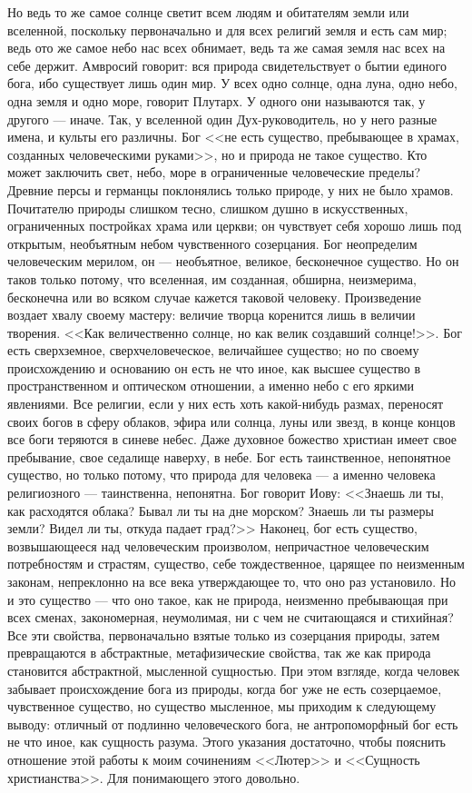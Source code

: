 \documentclass[12pt,oneside]{book}
\begin{document}
Но ведь то же самое солнце светит всем людям и обитателям земли или вселенной, поскольку первоначально и для всех религий земля и есть сам мир; ведь ото же самое небо нас всех обнимает, ведь та же самая земля нас всех на себе держит. Амвросий говорит: вся природа свидетельствует о бытии единого бога, ибо существует лишь один мир. У всех одно солнце, одна луна, одно небо, одна земля и одно море, говорит Плутарх. У одного они называются так, у другого --- иначе. Так, у вселенной один Дух-руководитель, но у него разные имена, и культы его различны. Бог <<не есть существо, пребывающее в храмах, созданных человеческими руками>>, но и природа не такое существо. Кто может заключить свет, небо, море в ограниченные человеческие пределы? Древние персы и германцы поклонялись только природе, у них не было храмов. Почитателю природы слишком тесно, слишком душно в искусственных, ограниченных постройках храма или церкви; он чувствует себя хорошо лишь под открытым, необъятным небом чувственного созерцания. Бог неопределим человеческим мерилом, он --- необъятное, великое, бесконечное существо. Но он таков только потому, что вселенная, им созданная, обширна, неизмерима, бесконечна или во всяком случае кажется таковой человеку. Произведение воздает хвалу своему мастеру: величие творца коренится лишь в величии творения. <<Как величественно солнце, но как велик создавший солнце!>>. Бог есть сверхземное, сверхчеловеческое, величайшее существо; но по своему происхождению и основанию он есть не что иное, как высшее существо в пространственном и оптическом отношении, а именно небо с его яркими явлениями. Все религии, если у них есть хоть какой-нибудь размах, переносят своих богов в сферу облаков, эфира или солнца, луны или звезд, в конце концов все боги теряются в синеве небес. Даже духовное божество христиан имеет свое пребывание, свое седалище наверху, в небе. Бог есть таинственное, непонятное существо, но только потому, что природа для человека --- а именно человека религиозного --- таинственна, непонятна. Бог говорит Иову: <<Знаешь ли ты, как расходятся облака? Бывал ли ты на дне морском? Знаешь ли ты размеры земли? Видел ли ты, откуда падает град?>> Наконец, бог есть существо, возвышающееся над человеческим произволом, непричастное человеческим потребностям и страстям, существо, себе тождественное, царящее по неизменным законам, непреклонно на все века утверждающее то, что оно раз установило. Но и это существо --- что оно такое, как не природа, неизменно пребывающая при всех сменах, закономерная, неумолимая, ни с чем не считающаяся и стихийная? Все эти свойства, первоначально взятые только из созерцания природы, затем превращаются в абстрактные, метафизические свойства, так же как природа становится абстрактной, мысленной сущностью. При этом взгляде, когда человек забывает происхождение бога из природы, когда бог уже не есть созерцаемое, чувственное существо, но существо мысленное, мы приходим к следующему выводу: отличный от подлинно человеческого бога, не антропоморфный бог есть не что иное, как сущность разума. Этого указания достаточно, чтобы пояснить отношение этой работы к моим сочинениям <<Лютер>> и <<Сущность христианства>>. Для понимающего этого довольно.
\end{document}
